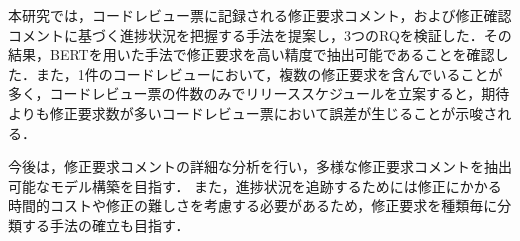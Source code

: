 \documentclass[submit,techrep,noauthor]{ipsj}
\begin{document}
本研究では，コードレビュー票に記録される修正要求コメント，および修正確認コメントに基づく進捗状況を把握する手法を提案し，3つのRQを検証した．その結果，BERTを用いた手法で修正要求を高い精度で抽出可能であることを確認した．また，1件のコードレビューにおいて，複数の修正要求を含んでいることが多く，コードレビュー票の件数のみでリリーススケジュールを立案すると，期待よりも修正要求数が多いコードレビュー票において誤差が生じることが示唆される．

今後は，修正要求コメントの詳細な分析を行い，多様な修正要求コメントを抽出可能なモデル構築を目指す．
また，進捗状況を追跡するためには修正にかかる時間的コストや修正の難しさを考慮する必要があるため，修正要求を種類毎に分類する手法の確立も目指す．



\end{document}
